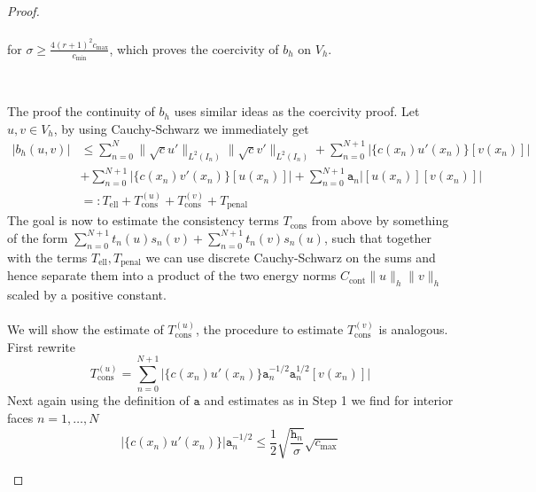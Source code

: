 \begin{proof}
\begin{proofstep}[Coercivity]
\begin{align*}
        \end{align*}
        for $\sigma \geq \frac{4 (r+1)^2 c_{\max} }{c_{\min}}$, which proves the coercivity
        of $b_h$ on $V_h$. 
    \end{proofstep}
    \\
    \begin{proofstep}[Continuity]
        The proof the continuity of $b_h$ uses similar ideas as the coercivity proof. Let 
        $u,v \in V_h$, by using Cauchy-Schwarz we 
        immediately get
        \begin{align}
            |b_h(u,v)| &\leq \sum_{n=0}^{N} \|\sqrt{c}u'\|_{L^2(I_n)} \|\sqrt{c}v'\|_{L^2(I_n)} 
            +  \sum_{n=0}^{N+1} \big| \{c(x_n)u'(x_n)\}[v(x_n)] \big| \nonumber \\ 
            &+\sum_{n=0}^{N+1} \big|\{c(x_n)v'(x_n)\}[u(x_n)]\big|
            +\sum_{n=0}^{N+1} \texttt{a}_n \big|[u(x_n)][v(x_n)]\big| \nonumber \\
            &=: T_{\text{ell}} + T_{\text{cons}}^{(u)} + T_{\text{cons}}^{(v)} + T_{\text{penal}}
            \label{eq:cont_thr_estimate_elliptic_part}            
        \end{align}
        The goal is now to estimate the consistency terms $T_{\text{cons}}$ from above by something of the form
        $ \sum_{n=0}^{N+1} t_n(u) s_n(v) + \sum_{n=0}^{N+1} t_n(v) s_n(u)$, such that together with the terms
        $T_{\text{ell}}, T_{\text{penal}}$ we can use discrete Cauchy-Schwarz on the sums and hence separate them into
        a product of the two energy norms $C_{\text{cont}} \|u\|_{h}\|v\|_{h} $ scaled by a positive constant. \\ \\
        We will show the estimate of $T_{\text{cons}}^{(u)}$, the procedure to estimate $T_{\text{cons}}^{(v)}$ is analogous. \\ 
        First rewrite
        \begin{equation}
            \label{eq:continuity_thr_consistency_term}
            T_{\text{cons}}^{(u)} = \sum_{n=0}^{N+1} \big| \{c(x_n)u'(x_n)\} \texttt{a}_n^{-1/2}\texttt{a}_n^{1/2} [v(x_n)] \big|
        \end{equation} 
        Next again using the definition of $\texttt{a}$ and estimates as in Step 1 we find for interior faces $n = 1,\ldots,N$
        \begin{equation}
            \big|\{c(x_n)u'(x_n)\}\big|\texttt{a}_n^{-1/2} 
            \leq \frac{1}{2} \sqrt{\frac{\texttt{h}_n}{\sigma}} \sqrt{c_{\max}}

\end{equation}
\end{proofstep}
\end{proof}
